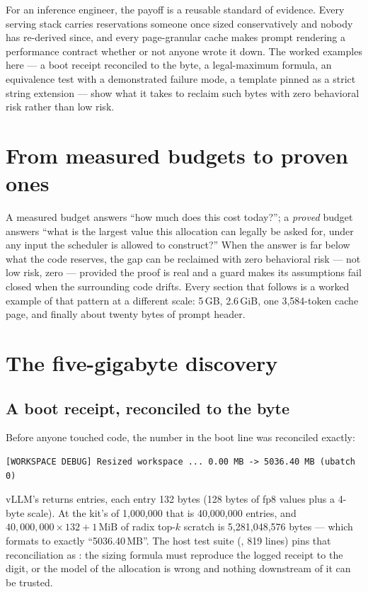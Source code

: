 For an inference engineer, the payoff is a reusable standard of evidence.
Every serving stack carries reservations someone once sized conservatively
and nobody has re-derived since, and every page-granular cache makes prompt
rendering a performance contract whether or not anyone wrote it down. The
worked examples here --- a boot receipt reconciled to the byte, a
legal-maximum formula, an equivalence test with a demonstrated failure mode,
a template pinned as a strict string extension --- show what it takes to
reclaim such bytes with zero behavioral risk rather than low risk.

\section{From measured budgets to proven ones}
\label{sec:proof-framing}

A measured budget answers ``how much does this cost today?''; a
\emph{proved} budget answers ``what is the largest value this allocation
can legally be asked for, under any input the scheduler is allowed to
construct?'' When the answer is far below what the code reserves, the gap
can be reclaimed with zero behavioral risk --- not low risk, zero ---
provided the proof is real and a guard makes its assumptions fail closed
when the surrounding code drifts. Every section that follows is a worked
example of that pattern at a different scale: 5\,GB, 2.6\,GiB, one
3{,}584-token cache page, and finally about twenty bytes of prompt header.

\section{The five-gigabyte discovery}
\label{sec:proof-workspace}

\subsection{A boot receipt, reconciled to the byte}

Before anyone touched code, the number in the boot line was reconciled
exactly:

\begin{lstlisting}
[WORKSPACE DEBUG] Resized workspace ... 0.00 MB -> 5036.40 MB (ubatch 0)
\end{lstlisting}

vLLM's  returns
 entries, each entry 132 bytes (128 bytes of fp8
values plus a 4-byte scale). At the kit's  of
1{,}000{,}000 that is 40{,}000{,}000 entries, and
$40{,}000{,}000 \times 132 + 1\,\text{MiB}$ of radix top-$k$ scratch is
5{,}281{,}048{,}576 bytes --- which formats to exactly ``5036.40\,MB''. The
host test suite (, 819 lines) pins
that reconciliation as : the
sizing formula must reproduce the logged receipt to the digit, or the model of
the allocation is wrong and nothing downstream of it can be trusted.

